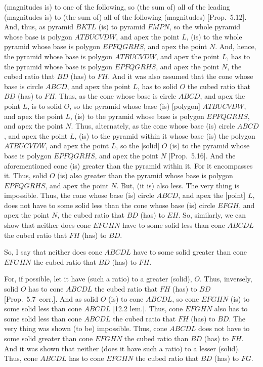 \begin{Parallel}{}{}
{ (magnitudes is) to one of the following, so (the sum of) all of the leading 
 (magnitudes is) to (the sum of) all of the
 following (magnitudes) [Prop.~5.12]. And, thus, as pyramid $BKTL$ (is) to pyramid $FMPN$,
 so the whole pyramid whose base is polygon $ATBUCVDW$, and apex the point $L$, (is) to the whole pyramid
 whose base is polygon $EPFQGRHS$, and apex the point $N$. And, hence, the pyramid whose base is polygon $ATBUCVDW$, and apex the point $L$, has to the pyramid
 whose base is polygon $EPFQGRHS$, and apex the point $N$, the cubed ratio that $BD$ (has) to $FH$. And it was also assumed that the cone whose base is circle $ABCD$, and apex the point $L$, has to solid $O$ the cubed ratio that $BD$ (has)
 to $FH$. Thus, as the cone whose base is circle $ABCD$, and apex the point $L$, is to solid $O$, so the pyramid
 whose base (is) [polygon] $ATBUCVDW$, and apex the point $L$, (is) to the pyramid whose base is polygon $EPFQGRHS$, and apex the point $N$. Thus, alternately, as the cone whose base (is) circle $ABCD$, and apex the point $L$, (is)
 to the pyramid within it whose base (is) the polygon $ATBUCVDW$, and apex the point $L$, so the [solid] $O$ (is)
 to the pyramid whose base is polygon  $EPFQGRHS$, and apex the point $N$ [Prop.~5.16]. And the aforementioned cone (is)
 greater than the pyramid within it. For it encompasses it. Thus, solid $O$ (is) also greater than the pyramid whose base is polygon  $EPFQGRHS$, and apex the point $N$. But, (it is) also less. The very thing is impossible. Thus, the cone whose
 base (is) circle $ABCD$, and apex the [point] $L$, does not have to some solid less than the cone whose
 base (is) circle $EFGH$, and apex the point $N$, the cubed ratio that $BD$ (has) to $EH$.  So, similarly,
 we can show that neither does cone $EFGHN$ have to some solid less than cone $ABCDL$ the cubed
 ratio that $FH$ (has) to $BD$.
 
So, I say that neither does cone $ABCDL$ have to some solid greater than cone $EFGHN$ the cubed ratio
that $BD$ (has) to $FH$.

For, if possible, let it have (such a ratio) to a greater (solid), $O$. Thus, inversely,  solid $O$ has to
cone $ABCDL$ the cubed ratio that $FH$ (has) to $BD$ [Prop.~5.7~corr.]. 
And as solid $O$ (is) to cone $ABCDL$, so cone $EFGHN$ (is) to some solid less than cone
$ABCDL$ [12.2 lem.]. Thus, cone $EFGHN$ also has to some solid less than cone $ABCDL$ the cubed
ratio that $FH$ (has) to $BD$. The very thing was shown (to be) impossible. Thus, cone $ABCDL$
does not have to some solid greater than cone $EFGHN$ the cubed ratio than $BD$ (has) to $FH$. And
it was shown that neither (does it have such a ratio) to a lesser (solid).  Thus, cone $ABCDL$ has
to cone $EFGHN$ the cubed ratio that $BD$ (has) to $FG$.

}
\end{Parallel}
